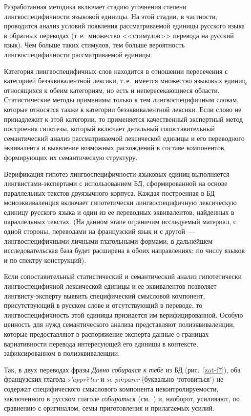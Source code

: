 \begin{multicols}{2}
  Разработанная методика включает стадию уточнения степени
лингвоспецифичности языковой единицы. На этой стадии, в частности,
проводится анализ условий появления рассматриваемой единицы русского
языка в обратных переводах (т.\,е.\ множество <<стимулов>> перевода на
русский язык). Чем больше таких стимулов, тем больше вероятность
лингвоспецифичности рассматриваемой единицы.

  Категория лингвоспецифичных слов находится в отношении пересечения с
категорией безэквивалентной лексики, т.\,е.\ имеется множество языковых
единиц, относящихся к обеим категориям, но есть и непересекающиеся
области. Статистические методы применимы только к тем лингвоспецифичным
словам, которые относятся также к категории безэквивалентной лексики. Если
слово не принадлежит к этой категории, то применяется качественный
экспертный метод построения гипотезы, который включает детальный
сопоставительный семантический анализ рассматриваемой лексической
единицы и его переводного эквивалента и выявление возможных расхождений
в составе компонентов, формирующих их семантическую структуру.

  Верификация гипотез лингвоспецифичности языковых единиц выполняется
лингвистами-экс\-пер\-та\-ми с использованием БД, сформированной на основе
параллельных текстов двуязычного корпуса. Каждая построенная в БД
моноэквиваленция включает гипотетически лингвоспецифичную лексическую
единицу русского языка и один из ее переводных эквивалентов, найденных в
параллельных текстах. (На данном этапе ограничим исследуемый материал, с
одной стороны, переводами на французский язык и с другой~---
лингвоспецифичными личными глагольными формами; в дальнейшем
исследовательская база будет расширена в обоих направлениях: по числу
языков и по спектру конструкций).

  Если сопоставительный статистический и семантический анализ
гипотетически лингвоспецифичной лексической единицы и ее эквивалентов
позволяет линг\-ви\-сту-экс\-пер\-ту выявить специфический смысловой
компонент, присутствующий в русском слове и отсутствующий в переводе, то
лингвоспецифичность этой единицы признается им верифицированной.
Особую ценность для нужд семантического анализа представляют
полиэквиваленции, которые предоставляют в распоряжение эксперта данные о
границах вариативности перевода интересующей его единицы в контексте,
зафиксированном в полиэквиваленции.

  Так, в двух переводах фразы \textit{Давно собирался к тебе} из
БД (рис.~\ref{zat-f7}), оба французских глагола
\textit{s'appr}$\hat{\mbox{\textit{e}}}$\textit{ter} и
\textit{se pr$\acute{\mbox{e}}$parer} (буквально
`готовиться') не содержат специфического смыслового компонента
неконтролируемости, заключенного в русском глаголе \textit{собираться}
(см.~\cite{zat-18}) и, наоборот, усиливают, по сравнению с оригиналом, семы
приготовления и прилагаемых усилий.


\end{multicols}
